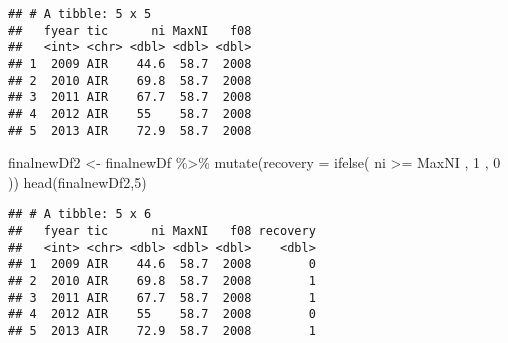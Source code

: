 \documentclass[
]{article}
\newenvironment{Shaded}{\begin{snugshade}}{\end{snugshade}}
\newcommand{\AttributeTok}[1]{\textcolor[rgb]{0.77,0.63,0.00}{#1}}
\newcommand{\DecValTok}[1]{\textcolor[rgb]{0.00,0.00,0.81}{#1}}
\newcommand{\FunctionTok}[1]{\textcolor[rgb]{0.00,0.00,0.00}{#1}}
\newcommand{\NormalTok}[1]{#1}
\newcommand{\OtherTok}[1]{\textcolor[rgb]{0.56,0.35,0.01}{#1}}
\newcommand{\SpecialCharTok}[1]{\textcolor[rgb]{0.00,0.00,0.00}{#1}}
\newcommand{\StringTok}[1]{\textcolor[rgb]{0.31,0.60,0.02}{#1}}
\begin{document}
\begin{Shaded}
\end{Shaded}

\begin{verbatim}
## # A tibble: 5 x 5
##   fyear tic      ni MaxNI   f08
##   <int> <chr> <dbl> <dbl> <dbl>
## 1  2009 AIR    44.6  58.7  2008
## 2  2010 AIR    69.8  58.7  2008
## 3  2011 AIR    67.7  58.7  2008
## 4  2012 AIR    55    58.7  2008
## 5  2013 AIR    72.9  58.7  2008
\end{verbatim}

\begin{Shaded}
\begin{Highlighting}[]
\NormalTok{finalnewDf2 }\OtherTok{\textless{}{-}}\NormalTok{ finalnewDf }\SpecialCharTok{\%\textgreater{}\%} \FunctionTok{mutate}\NormalTok{(}\AttributeTok{recovery =} \FunctionTok{ifelse}\NormalTok{( ni }\SpecialCharTok{\textgreater{}=}\NormalTok{ MaxNI , }\DecValTok{1}\NormalTok{ , }\DecValTok{0}\NormalTok{ ))}
\FunctionTok{head}\NormalTok{(finalnewDf2,}\DecValTok{5}\NormalTok{)}
\end{Highlighting}
\end{Shaded}

\begin{verbatim}
## # A tibble: 5 x 6
##   fyear tic      ni MaxNI   f08 recovery
##   <int> <chr> <dbl> <dbl> <dbl>    <dbl>
## 1  2009 AIR    44.6  58.7  2008        0
## 2  2010 AIR    69.8  58.7  2008        1
## 3  2011 AIR    67.7  58.7  2008        1
## 4  2012 AIR    55    58.7  2008        0
## 5  2013 AIR    72.9  58.7  2008        1
\end{verbatim}
\end{document}
